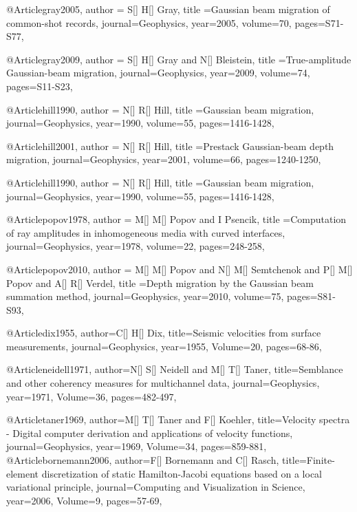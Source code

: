 @Article{gray2005,
  author = {S[] H[] Gray},
  title ={Gaussian beam migration of common-shot records},
  journal={Geophysics},
  year=2005,
  volume=70,
  pages={S71-S77},
}

@Article{gray2009,
  author = {S[] H[] Gray and N[] Bleistein},
  title ={True-amplitude Gaussian-beam migration},
  journal={Geophysics},
  year=2009,
  volume=74,
  pages={S11-S23},
}

@Article{hill1990,
  author = {N[] R[] Hill},
  title ={Gaussian beam migration},
  journal={Geophysics},
  year=1990,
  volume=55,
  pages={1416-1428},
}

@Article{hill2001,
  author = {N[] R[] Hill},
  title ={Prestack Gaussian-beam depth migration},
  journal={Geophysics},
  year=2001,
  volume=66,
  pages={1240-1250},
}

@Article{hill1990,
  author = {N[] R[] Hill},
  title ={Gaussian beam migration},
  journal={Geophysics},
  year=1990,
  volume=55,
  pages={1416-1428},
}

@Article{popov1978,
  author = {M[] M[] Popov and I Psencik},
  title ={Computation of ray amplitudes in inhomogeneous media with curved interfaces},
  journal={Geophysics},
  year=1978,
  volume=22,
  pages={248-258},
}

@Article{popov2010,
  author = {M[] M[] Popov and N[] M[] Semtchenok and P[] M[] Popov and A[] R[] Verdel},
  title ={Depth migration by the Gaussian beam summation method},
  journal={Geophysics},
  year=2010,
  volume=75,
  pages={S81-S93},
}

@Article{dix1955,
  author={C[] H[] Dix},
  title={Seismic velocities from surface measurements},
  journal={Geophysics},
  year=1955,
  Volume=20,
  pages={68-86},
}

@Article{neidell1971,
  author={N[] S[] Neidell and M[] T[] Taner},
  title={Semblance and other coherency measures for multichannel data},
  journal={Geophysics},
  year=1971,
  Volume=36,
  pages={482-497},
}

@Article{taner1969,
  author={M[] T[] Taner and F[] Koehler},
  title={Velocity spectra - Digital computer derivation and applications of velocity functions},
  journal={Geophysics},
  year=1969,
  Volume=34,
  pages={859-881},
}
@Article{bornemann2006,
  author={F[] Bornemann and C[] Rasch},
  title={Finite-element discretization of static Hamilton-Jacobi equations based on a local variational principle},
  journal={Computing and Visualization in Science},
  year=2006,
  Volume=9,
  pages={57-69},
}

